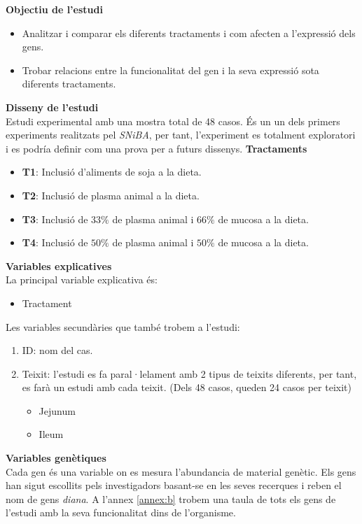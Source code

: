 \documentclass[english]{article}
\begin{document}
\noindent\textbf{Objectiu de l'estudi}
\begin{itemize}
  \item Analitzar i comparar els diferents tractaments i com afecten a l'expressió dels gens.
  \item Trobar relacions entre la funcionalitat del gen i la seva expressió sota diferents tractaments.
\end{itemize}
\noindent\textbf{Disseny de l'estudi}\\
Estudi experimental amb una mostra total de 48 casos. És un un dels primers experiments realitzats pel \textit{SNiBA}, per tant, l'experiment es totalment exploratori i es podría definir com una prova per a futurs dissenys.
\noindent\textbf{Tractaments}
\begin{itemize}
  \item \textbf{T1}: Inclusió d'aliments de soja a la dieta.
  \item \textbf{T2}: Inclusió de plasma animal a la dieta.
  \item \textbf{T3}: Inclusió de $33\%$ de plasma animal i  $66\%$ de mucosa a la dieta.
  \item \textbf{T4}: Inclusió de $50\%$ de plasma animal i  $50\%$ de mucosa a la dieta.
\end{itemize}
\noindent\textbf{Variables explicatives}\\
La principal variable explicativa és:
\begin{itemize}
  \item Tractament
\end{itemize}
Les variables secundàries que també trobem a l'estudi:
\begin{enumerate}
  \item ID: nom del cas.
  \item Teixit: l'estudi es fa paral·lelament amb 2 tipus de teixits diferents, per tant, es farà un estudi amb cada teixit. (Dels 48 casos, queden 24 casos per teixit)
  \begin{itemize}
    \item Jejunum
    \item Ileum
  \end{itemize}
\end{enumerate}
\noindent\textbf{Variables genètiques}\\
Cada gen és una variable on es mesura l'abundancia de material genètic. Els gens han sigut escollits pels investigadors basant-se en les seves recerques i reben el nom de gens \textit{diana}. A l'annex \ref{annex:b} trobem una taula de tots els gens de l'estudi amb la seva funcionalitat dins de l'organisme.
\end{document}
